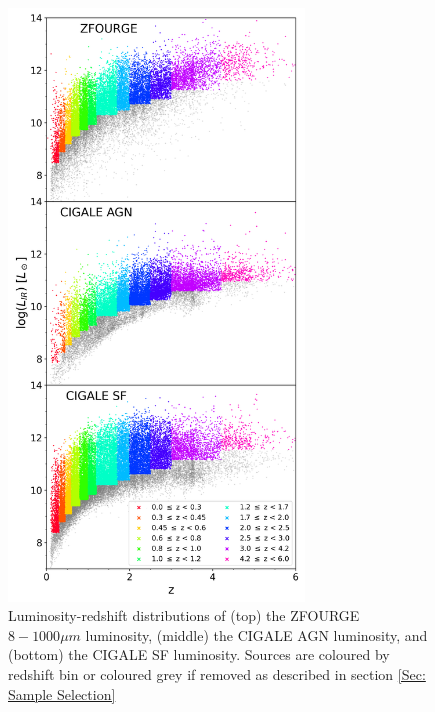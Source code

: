 \begin{figure}
    \centering
    \includegraphics[width=0.7\textwidth]{Figures/LIR_vs_Z.png}
    \caption{Luminosity-redshift distributions of (top) the ZFOURGE $8-1000\mu m$ luminosity, (middle) the CIGALE AGN luminosity, and (bottom) the CIGALE SF luminosity. Sources are coloured by redshift bin or coloured grey if removed as described in section \ref{Sec: Sample Selection}}
    \label{Fig: ZF Lum vs z}
\end{figure}













